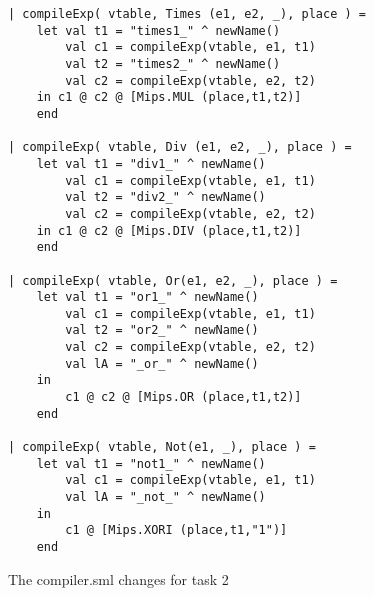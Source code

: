 \documentclass[12pt,a4paper,english]{article}
\begin{document}
\begin{figure}[h]
\begin{lstlisting}
| compileExp( vtable, Times (e1, e2, _), place ) =
    let val t1 = "times1_" ^ newName()
        val c1 = compileExp(vtable, e1, t1)
        val t2 = "times2_" ^ newName()
        val c2 = compileExp(vtable, e2, t2)
    in c1 @ c2 @ [Mips.MUL (place,t1,t2)]
    end

| compileExp( vtable, Div (e1, e2, _), place ) =
    let val t1 = "div1_" ^ newName()
        val c1 = compileExp(vtable, e1, t1)
        val t2 = "div2_" ^ newName()
        val c2 = compileExp(vtable, e2, t2)
    in c1 @ c2 @ [Mips.DIV (place,t1,t2)]
    end

| compileExp( vtable, Or(e1, e2, _), place ) =
    let val t1 = "or1_" ^ newName()
        val c1 = compileExp(vtable, e1, t1)
        val t2 = "or2_" ^ newName()
        val c2 = compileExp(vtable, e2, t2)
        val lA = "_or_" ^ newName()
    in 
        c1 @ c2 @ [Mips.OR (place,t1,t2)]
    end
        
| compileExp( vtable, Not(e1, _), place ) =
    let val t1 = "not1_" ^ newName()
        val c1 = compileExp(vtable, e1, t1)
        val lA = "_not_" ^ newName()
    in 
        c1 @ [Mips.XORI (place,t1,"1")]
    end
\end{lstlisting}
\caption{The compiler.sml changes for task 2}\end{figure}
\end{document}

